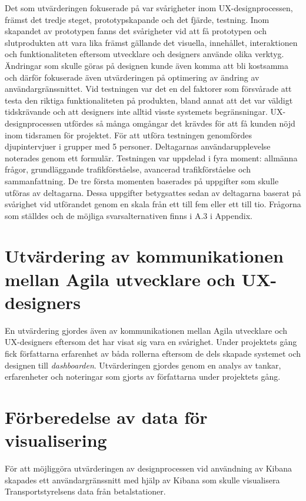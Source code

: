 \documentclass[12pt]{kththesis}
\begin{document}
Det som utvärderingen fokuserade på var svårigheter inom UX-designprocessen, främst det tredje steget, prototypskapande och det fjärde, testning. Inom skapandet av prototypen fanns det svårigheter vid att få prototypen och slutprodukten att vara lika främst gällande det visuella, innehållet, interaktionen och funktionaliteten eftersom utvecklare och designers använde olika verktyg. Ändringar som skulle göras på designen kunde även komma att bli kostsamma och därför fokuserade även utvärderingen på optimering av ändring av användargränssnittet. Vid testningen var det en del faktorer som försvårade att testa den riktiga funktionaliteten på produkten, bland annat att det var väldigt tidskrävande och att designers inte alltid visste systemets begränsningar. UX-designprocessen utfördes så många omgångar det krävdes för att få kunden nöjd inom tidsramen för projektet. För att utföra testningen genomfördes djupintervjuer i grupper med 5 personer. Deltagarnas användarupplevelse noterades genom ett formulär. Testningen var uppdelad i fyra moment: allmänna frågor, grundläggande trafikförståelse, avancerad trafikförståelse och sammanfattning. De tre första momenten baserades på uppgifter som skulle utföras av deltagarna. Dessa uppgifter betygsattes sedan av deltagarna baserat på svårighet vid utförandet genom en skala från ett till fem eller ett till tio. Frågorna som ställdes och de möjliga svarsalternativen finns i A.3 i Appendix.


\section{Utvärdering av kommunikationen mellan Agila utvecklare och UX-designers}

En utvärdering gjordes även av kommunikationen mellan Agila utvecklare och UX-designers eftersom det har visat sig vara en svårighet. Under projektets gång fick författarna erfarenhet av båda rollerna eftersom de dels skapade systemet och designen till \textit{dashboarden}. Utvärderingen gjordes genom en analys av tankar, erfarenheter och noteringar som gjorts av författarna under projektets gång. 


\section{Förberedelse av data för visualisering}

För att möjliggöra utvärderingen av designprocessen vid användning av Kibana skapades ett användargränssnitt med hjälp av Kibana som skulle visualisera Transportstyrelsens data från betalstationer.
\end{document}
